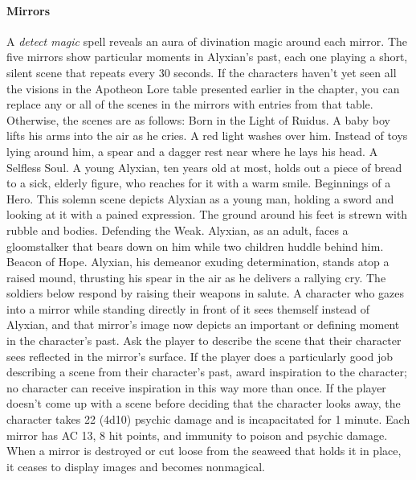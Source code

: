 \documentclass[10pt,a4,twoside,twocolumn,openany,nodeprecatedcode]{dndbook}
\begin{document}
\paragraph{Mirrors}
A \textit{detect magic} spell reveals an aura of divination magic around each mirror. The five mirrors show particular moments in Alyxian's past, each one playing a short, silent scene that repeats every 30 seconds. If the characters haven't yet seen all the visions in the Apotheon Lore table presented earlier in the chapter, you can replace any or all of the scenes in the mirrors with entries from that table. Otherwise, the scenes are as follows:
{{Born in the Light of Ruidus. A baby boy lifts his arms into the air as he cries. A red light washes over him. Instead of toys lying around him, a spear and a dagger rest near where he lays his head.}}
{{A Selfless Soul. A young Alyxian, ten years old at most, holds out a piece of bread to a sick, elderly figure, who reaches for it with a warm smile.}}
{{Beginnings of a Hero. This solemn scene depicts Alyxian as a young man, holding a sword and looking at it with a pained expression. The ground around his feet is strewn with rubble and bodies.}}
{{Defending the Weak. Alyxian, as an adult, faces a gloomstalker that bears down on him while two children huddle behind him.}}
{{Beacon of Hope. Alyxian, his demeanor exuding determination, stands atop a raised mound, thrusting his spear in the air as he delivers a rallying cry. The soldiers below respond by raising their weapons in salute.}}
A character who gazes into a mirror while standing directly in front of it sees themself instead of Alyxian, and that mirror's image now depicts an important or defining moment in the character's past. Ask the player to describe the scene that their character sees reflected in the mirror's surface. If the player does a particularly good job describing a scene from their character's past, award inspiration to the character; no character can receive inspiration in this way more than once. If the player doesn't come up with a scene before deciding that the character looks away, the character takes 22 (4d10) psychic damage and is incapacitated for 1 minute.
Each mirror has AC 13, 8 hit points, and immunity to poison and psychic damage. When a mirror is destroyed or cut loose from the seaweed that holds it in place, it ceases to display images and becomes nonmagical.
\end{document}
